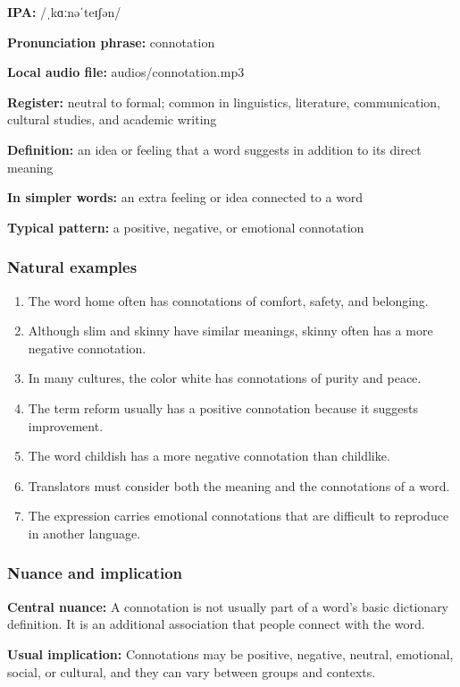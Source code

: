 \documentclass[11pt]{article}
\begin{document}
\textbf{IPA:} /ˌkɑːnəˈteɪʃən/

\textbf{Pronunciation phrase:} connotation

\textbf{Local audio file:} audios/connotation.mp3

\textbf{Register:} neutral to formal; common in linguistics, literature, communication, cultural studies, and academic writing

\textbf{Definition:} an idea or feeling that a word suggests in addition to its direct meaning

\textbf{In simpler words:} an extra feeling or idea connected to a word

\textbf{Typical pattern:} a positive, negative, or emotional connotation

\subsubsection{Natural examples}
\begin{enumerate}
  \item The word home often has connotations of comfort, safety, and belonging.
  \item Although slim and skinny have similar meanings, skinny often has a more negative connotation.
  \item In many cultures, the color white has connotations of purity and peace.
  \item The term reform usually has a positive connotation because it suggests improvement.
  \item The word childish has a more negative connotation than childlike.
  \item Translators must consider both the meaning and the connotations of a word.
  \item The expression carries emotional connotations that are difficult to reproduce in another language.
\end{enumerate}

\subsubsection{Nuance and implication}
\textbf{Central nuance:} A connotation is not usually part of a word's basic dictionary definition. It is an additional association that people connect with the word.

\textbf{Usual implication:} Connotations may be positive, negative, neutral, emotional, social, or cultural, and they can vary between groups and contexts.
\end{document}
